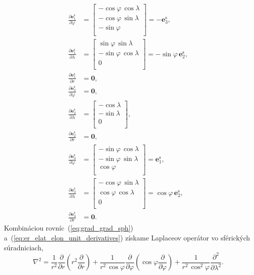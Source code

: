 \documentclass[a4paper,12pt]{book}
\let\vec\mathbf
\begin{document}
\begin{equation}
\label{eq:er_elat_elon_unit_derivatives}
\begin{split}
\frac{\partial \vec e_1^\mathrm{s}}{\partial \varphi} &=
%
\begin{bmatrix}
-\cos\varphi \, \cos\lambda\\
-\cos\varphi \, \sin\lambda\\
-\sin\varphi\\
\end{bmatrix}
%
= -\vec e_3^\mathrm{s}
%
{,}\\
%
\frac{\partial \vec e_1^\mathrm{s}}{\partial \lambda} &=
%
\begin{bmatrix}
 \sin\varphi \, \sin\lambda\\
-\sin\varphi \, \cos\lambda\\
0\\
\end{bmatrix}
%
= -\sin\varphi \, \vec e_2^\mathrm{s}
%
{,}\\
%
\frac{\partial \vec e_1^\mathrm{s}}{\partial r} &= \vec 0{,}\\
%
\frac{\partial \vec e_2^\mathrm{s}}{\partial \varphi} &= \vec 0{,}\\
%
\frac{\partial \vec e_2^\mathrm{s}}{\partial \lambda} &=
%
\begin{bmatrix}
-\cos\lambda\\
-\sin\lambda\\
0\\
\end{bmatrix}
%
{,}\\
%
\frac{\partial \vec e_2^\mathrm{s}}{\partial r} &= \vec 0{,}\\
%
\frac{\partial \vec e_3^\mathrm{s}}{\partial \varphi} &=
%
\begin{bmatrix}
-\sin\varphi \, \cos\lambda\\
-\sin\varphi \, \sin\lambda\\
\cos\varphi\\
\end{bmatrix}
%
= \vec e_1^\mathrm{s}
%
{,}\\
%
\frac{\partial \vec e_3^\mathrm{s}}{\partial \lambda} &=
%
\begin{bmatrix}
-\cos\varphi \, \sin\lambda\\
 \cos\varphi \, \cos\lambda\\
0\\
\end{bmatrix}
%
= \cos\varphi \, \vec e_2^\mathrm{s}
%
{,}\\
%
\frac{\partial \vec e_3^\mathrm{s}}{\partial r} &= \vec 0{.}
\end{split}
\end{equation}
%
Kombináciou rovníc~(\ref{eq:grad_grad_sph}) 
a~(\ref{eq:er_elat_elon_unit_derivatives}) získame Laplaceov operátor vo 
sférických súradniciach,
%
\begin{equation}
\label{eq:laplace_sph}
\nabla^2 = \frac{1}{r^2} \frac{\partial}{\partial r} \left( r^2
\frac{\partial}{\partial r} \right) + \frac{1}{r^2 \, \cos\varphi}
\frac{\partial}{\partial \varphi} \left( \cos\varphi \frac{\partial}{\partial 
\varphi} \right) + \frac{1}{r^2 \,
\cos^2\varphi}\frac{\partial^2}{\partial \lambda^2}{.}
\end{equation}
\end{document}
